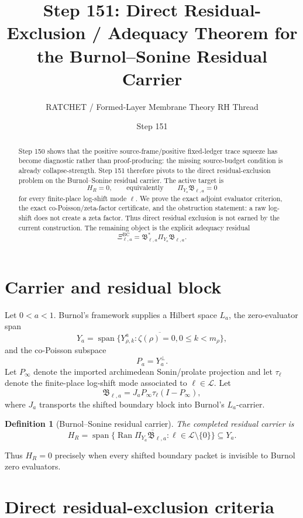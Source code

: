 \documentclass[11pt]{article}
\title{Step 151: Direct Residual-Exclusion / Adequacy Theorem for the Burnol--Sonine Residual Carrier}
\author{RATCHET / Formed-Layer Membrane Theory RH Thread}
\date{Step 151}
\newtheorem{definition}{Definition}
\newcommand{\BC}{\mathrm{BC}}
\newcommand{\Ran}{\operatorname{Ran}}
\newcommand{\Span}{\operatorname{span}}
\begin{document}
\maketitle

\begin{abstract}
Step 150 shows that the positive source-frame/positive fixed-ledger trace squeeze has become diagnostic rather than proof-producing: the missing source-budget condition is already collapse-strength. Step 151 therefore pivots to the direct residual-exclusion problem on the Burnol--Sonine residual carrier. The active target is
\[
        H_R=0,
        \qquad\text{equivalently}\qquad
        \Pi_{Y_a}\mathfrak B_{\ell,a}=0
\]
for every finite-place log-shift mode \(\ell\). We prove the exact adjoint evaluator criterion, the exact co-Poisson/zeta-factor certificate, and the obstruction statement: a raw log-shift does not create a zeta factor. Thus direct residual exclusion is not earned by the current construction. The remaining object is the explicit adequacy residual
\[
        \Xi^{\BC}_{\ell,a}=\mathfrak B_{\ell,a}^{*}\Pi_{Y_a}\mathfrak B_{\ell,a}.
\]
\end{abstract}

\section{Carrier and residual block}

Let \(0<a<1\). Burnol's framework supplies a Hilbert space \(L_a\), the zero-evaluator span
\[
        Y_a=\overline{\Span\{Y^a_{\rho,k}:\zeta(\rho)=0,
        0\le k<m_\rho\}},
\]
and the co-Poisson subspace
\[
        P_a=Y_a^\perp .
\]
Let \(P_\infty\) denote the imported archimedean Sonin/prolate projection and let \(\tau_\ell\) denote the finite-place log-shift mode associated to \(\ell\in\mathcal L\). Let
\[
        \mathfrak B_{\ell,a}
        =J_aP_\infty\tau_\ell(I-P_\infty),
\]
where \(J_a\) transports the shifted boundary block into Burnol's \(L_a\)-carrier.

\begin{definition}[Burnol--Sonine residual carrier]
The completed residual carrier is
\[
        H_R
        =\overline{\Span\{\Ran\Pi_{Y_a}\mathfrak B_{\ell,a}:
        \ell\in\mathcal L\setminus\{0\}\}}
        \subseteq Y_a.
\]
\end{definition}

Thus \(H_R=0\) precisely when every shifted boundary packet is invisible to Burnol zero evaluators.

\section{Direct residual-exclusion criteria}
\end{document}
